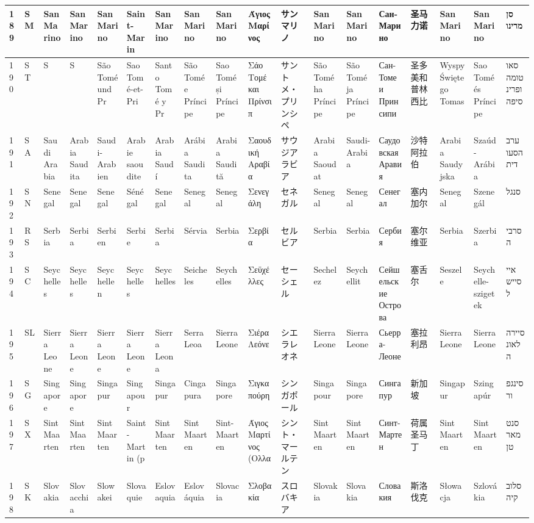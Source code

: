 \begin{longtable}{|l|l|l|l|l|l|l|l|l|l|l|l|l|l|l|l|l|l|}
189 & SM & San Marino & San Marino & San Marino & Saint-Marin & San Marino & San Marino & San Marino & Άγιος Μαρίνος & サンマリノ & San Marino & San Marino & Сан-Марино & 圣马力诺 & San Marino & San Marino & סן מרינו \\ \hline 
190 & ST & S & S & São Tomé und Pr & Sao Tomé-et-Pri & Santo Tomé y Pr & São Tomé e Príncipe & Sao Tomé și Príncipe & Σάο Τομέ και Πρίνσιπ & サントメ・プリンシペ & São Tomé ha Príncipe & São Tomé ja Príncipe & Сан-Томе и Принсипи & 圣多美和普林西比 & Wyspy Świętego Tomas & Sao Tomé és Príncipe & סאו טומה ופרינסיפה \\ \hline 
191 & SA & Saudi Arabia & Arabia Saudita & Saudi-Arabien & Arabie saoudite & Arabia Saudí & Arábia Saudita & Arabia Saudită & Σαουδική Αραβία & サウジアラビア & Arabia Saoudat & Saudi-Arabia & Саудовская Аравия & 沙特阿拉伯 & Arabia Saudyjska & Szaúd-Arábia & ערב הסעודית \\ \hline 
192 & SN & Senegal & Senegal & Senegal & Sénégal & Senegal & Senegal & Senegal & Σενεγάλη & セネガル & Senegal & Senegal & Сенегал & 塞内加尔 & Senegal & Szenegál & סנגל \\ \hline 
193 & RS & Serbia & Serbia & Serbien & Serbie & Serbia & Sérvia & Serbia & Σερβία & セルビア & Serbia & Serbia & Сербия & 塞尔维亚 & Serbia & Szerbia & סרביה \\ \hline 
194 & SC & Seychelles & Seychelles & Seychellen & Seychelles & Seychelles & Seicheles & Seychelles & Σεϋχέλλες & セーシェル & Sechelez & Seychellit & Сейшельские Острова & 塞舌尔 & Seszele & Seychelle-szigetek & איי סיישל \\ \hline 
195 & SL & Sierra Leone & Sierra Leone & Sierra Leone & Sierra Leone & Sierra Leona & Serra Leoa & Sierra Leone & Σιέρα Λεόνε & シエラレオネ & Sierra Leone & Sierra Leone & Сьерра-Леоне & 塞拉利昂 & Sierra Leone & Sierra Leone & סיירה לאונה \\ \hline 
196 & SG & Singapore & Singapore & Singapur & Singapour & Singapur & Cingapura & Singapore & Σιγκαπούρη & シンガポール & Singapour & Singapore & Сингапур & 新加坡 & Singapur & Szingapúr & סינגפור \\ \hline 
197 & SX & Sint Maarten & Sint Maarten & Sint Maarten & Saint-Martin (p & Sint Maarten & Sint Maarten & Sint-Maarten & Άγιος Μαρτίνος (Ολλα & シント・マールテン & Sint Maarten & Sint Maarten & Синт-Мартен & 荷属圣马丁 & Sint Maarten & Sint Maarten & סנט מארטן \\ \hline 
198 & SK & Slovakia & Slovacchia & Slowakei & Slovaquie & Eslovaquia & Eslováquia & Slovacia & Σλοβακία & スロバキア & Slovakia & Slovakia & Словакия & 斯洛伐克 & Słowacja & Szlovákia & סלובקיה \\ \hline 

\end{longtable}
